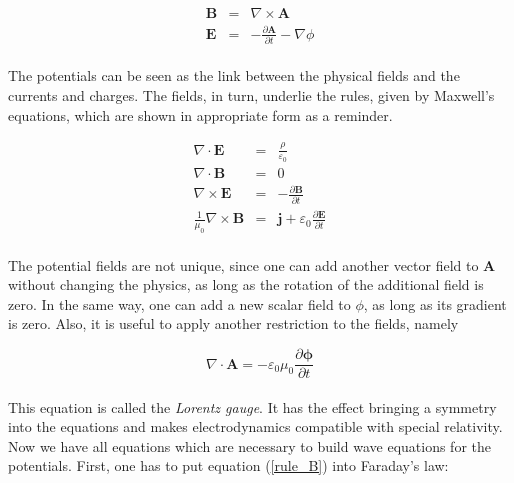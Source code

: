 \documentclass[a4paper,10pt]{thesis}
\begin{document}
\begin{eqnarray}
\mathbf{B}&=&\nabla \times \mathbf{A} \label{rule_B}\\
\mathbf{E}&=&-\frac{\partial \mathbf{A}}{\partial t}-\nabla \phi \label{rule_E}
\end{eqnarray}
\paragraph*{}
The potentials can be seen as the link between the physical fields and the currents and charges. The  fields, in turn, underlie the rules, given by Maxwell's equations, which are shown in appropriate form as a reminder.

\begin{eqnarray}\label{maxwell}
\nabla \cdot \mathbf{E}&=&\frac{\rho}{\varepsilon_0}\\
\nabla \cdot \mathbf{B}&=&0\\
\nabla \times \mathbf{E}&=&-\frac{\partial \mathbf{B}}{\partial t}\\
\frac{1}{\mu_0}\nabla \times \mathbf{B}&=&\mathbf{j}+\varepsilon_0 \frac{\partial \mathbf{E}}{\partial t}
\end{eqnarray}

\paragraph*{}
The potential fields are not unique, since one can add another vector field to \textbf{A} without changing the physics, as long as the rotation of the additional field is zero. In the same way, one can add a new scalar field to $\phi$, as long as its gradient is zero. Also, it is useful to apply another restriction to the fields, namely

\begin{equation}\label{lorenz}
\nabla \cdot \mathbf{A}=-\varepsilon_0 \mu_0\frac{\partial \mathbf{\phi}}{\partial t}
\end{equation}

\paragraph*{}
This equation is called the \emph{Lorentz gauge}. It has the effect bringing a symmetry into the equations and makes electrodynamics compatible with special relativity. Now we have all equations which are necessary to build wave equations for the potentials. First, one has to put equation (\ref{rule_B}) into Faraday's law:
\end{document}
